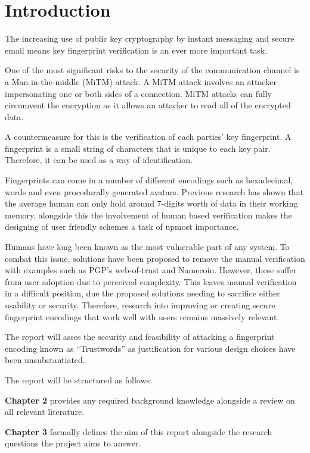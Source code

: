 \chapter{Introduction}
\label{cha:Introduction}

The increasing use of public key cryptography by instant messaging and secure email means key fingerprint  verification is an ever more important task. 

One of the most significant risks to the security of the communication channel is a Man-in-the-middle (MiTM) attack. A MiTM attack involves an attacker impersonating one or both sides of a connection. MiTM attacks can fully circumvent the encryption as it allows an attacker to read all of the encrypted data. 

A countermeasure for this is the verification of each parties' key fingerprint. A fingerprint is a small string of characters that is unique to each key pair. Therefore, it can be used as a way of identification. 

Fingerprints can come in a number of different encodings such as hexadecimal, words and even procedurally generated avatars. Previous research has shown that the average human can only hold around 7-digits worth of data in their working memory\cite{miller1956magical}, alongside this the involvement of human based verification makes the designing of user friendly schemes a task of upmost importance.

Humans have long been known as the most vulnerable part of any system. To combat this issue, solutions have been proposed to remove the manual verification with examples such as PGP's web-of-trust\cite{callas1998openpgp} and Namecoin\cite{kalodner2015empirical}. However, these suffer from user adoption due to perceived complexity. This leaves manual verification in a difficult position, due the proposed solutions needing to sacrifice either usability or security. Therefore, research into improving or creating secure fingerprint encodings that work well with users remains massively relevant.

The report will asses the security and feasibility of attacking a fingerprint encoding known as ``Trustwords'' as justification for various design choices have been unsubstantiated. 

The report will be structured as follows:

\textbf{Chapter 2} provides any required background knowledge alongside a review on all relevant literature.

\textbf{Chapter 3} formally defines the aim of this report alongside the research questions the project aims to answer.

